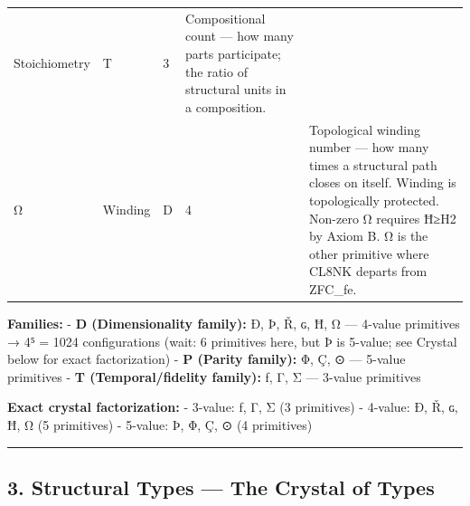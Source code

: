 \begin{longtable}[]{@{}lllll@{}}
\begin{minipage}[t]{0.12\columnwidth}
Stoichiometry\strut
\end{minipage} & \begin{minipage}[t]{0.16\columnwidth}\raggedright
T\strut
\end{minipage} & \begin{minipage}[t]{0.16\columnwidth}\raggedright
3\strut
\end{minipage} & \begin{minipage}[t]{0.27\columnwidth}\raggedright
Compositional count --- how many parts participate; the ratio of
structural units in a composition.\strut
\end{minipage}\tabularnewline
\begin{minipage}[t]{0.14\columnwidth}\raggedright
Ω\strut
\end{minipage} & \begin{minipage}[t]{0.12\columnwidth}\raggedright
Winding\strut
\end{minipage} & \begin{minipage}[t]{0.16\columnwidth}\raggedright
D\strut
\end{minipage} & \begin{minipage}[t]{0.16\columnwidth}\raggedright
4\strut
\end{minipage} & \begin{minipage}[t]{0.27\columnwidth}\raggedright
Topological winding number --- how many times a structural path closes
on itself. Winding is topologically protected. Non-zero Ω requires Ħ≥H2
by Axiom B. Ω is the other primitive where CL8NK departs from
ZFC\_fe.\strut
\end{minipage}\tabularnewline
\bottomrule
\end{longtable}

\textbf{Families:} - \textbf{D (Dimensionality family):} Ð, Þ, Ř, ɢ, Ħ,
Ω --- 4-value primitives → 4⁵ = 1024 configurations (wait: 6 primitives
here, but Þ is 5-value; see Crystal below for exact factorization) -
\textbf{P (Parity family):} Φ, Ç, ⊙ --- 5-value primitives - \textbf{T
(Temporal/fidelity family):} ƒ, Γ, Σ --- 3-value primitives

\textbf{Exact crystal factorization:} - 3-value: ƒ, Γ, Σ (3 primitives)
- 4-value: Ð, Ř, ɢ, Ħ, Ω (5 primitives) - 5-value: Þ, Φ, Ç, ⊙ (4
primitives)

\begin{center}\rule{0.5\linewidth}{0.5pt}\end{center}

\hypertarget{structural-types-the-crystal-of-types}{%
\subsection{3. Structural Types --- The Crystal of
Types}\label{structural-types-the-crystal-of-types}}

